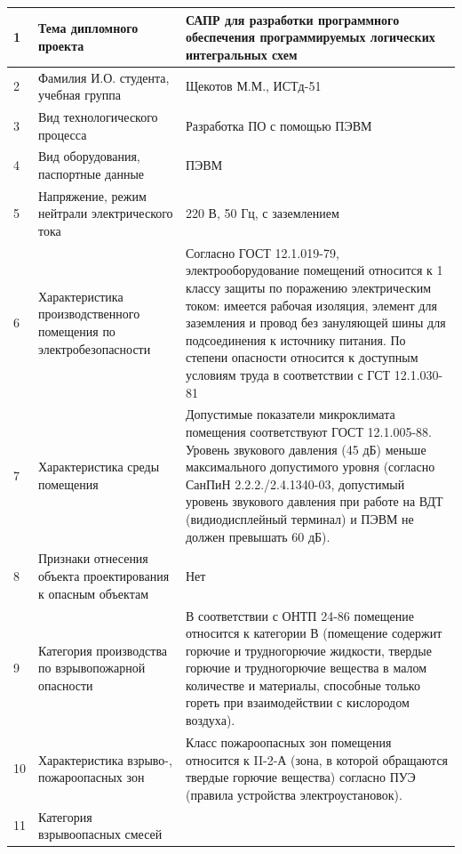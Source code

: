 \begin{longtable}[h]{|p{}|p{}|p{}|}
    1                                                      &
    Тема дипломного проекта                                &
    САПР для разработки программного обеспечения программируемых логических интегральных схем
  \\ \hline
    2                                     &
    Фамилия И.О. студента, учебная группа &
    Щекотов М.М., ИСТд-51
  \\ \hline
    3                             &
    Вид технологического процесса &
    Разработка ПО с помощью ПЭВМ
  \\ \hline
    4                                   &
    Вид оборудования, паспортные данные &
    ПЭВМ
  \\ \hline
    5                                              &
    Напряжение, режим нейтрали электрического тока &
    220 В, 50 Гц, с заземлением
  \\ \hline
    6 &
    Характеристика производственного помещения по электробезопасности &
    Согласно ГОСТ 12.1.019-79, электрооборудование помещений относится к 1 классу защиты по поражению электрическим током: имеется рабочая изоляция, элемент для заземления и провод без зануляющей шины для подсоединения к источнику питания.
    По степени опасности относится к доступным условиям труда в соответствии с ГСТ 12.1.030-81
  \\ \hline
    7 &
    Характеристика среды помещения &
    Допустимые показатели микроклимата помещения соответствуют ГОСТ 12.1.005-88.
    Уровень звукового давления (45 дБ) меньше максимального допустимого уровня (согласно СанПиН 2.2.2./2.4.1340-03, допустимый уровень звукового давления при работе на ВДТ (видиодисплейный терминал) и ПЭВМ не должен превышать 60 дБ).
  \\ \hline
    8 &
    Признаки отнесения объекта проектирования к опасным объектам &
    Нет
  \\ \hline
    9 &
    Категория производства по взрывопожарной опасности &
    В соответствии с ОНТП 24-86 помещение относится к категории В (помещение содержит горючие и трудногорючие жидкости, твердые горючие и трудногорючие вещества в малом количестве и материалы, способные только гореть при взаимодействии с кислородом  воздуха).
  \\ \hline
    10 &
    Характеристика взрыво-, пожароопасных зон &
    Класс пожароопасных зон помещения относится к II-2-А (зона, в которой обращаются твердые горючие вещества) согласно ПУЭ (правила устройства электроустановок).
  \\ \hline
    11 &
    Категория взрывоопасных смесей &

\end{longtable}
